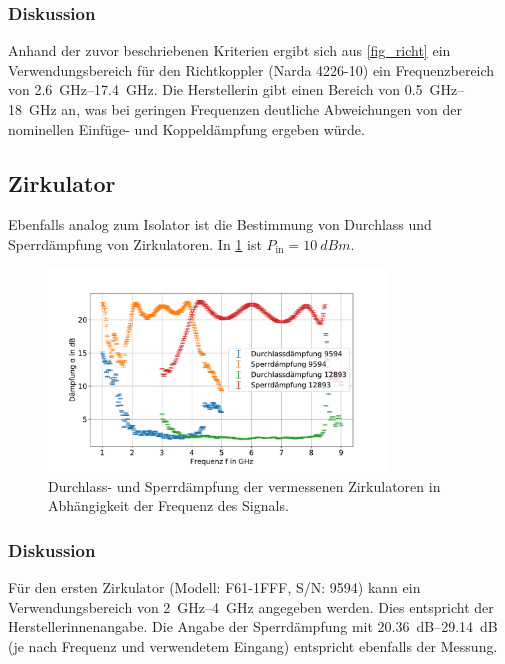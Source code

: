\documentclass[
	a4paper,
	12pt,
	pagesize,
	ngerman
]{scrartcl}
\begin{document}
	\subsubsection*{Diskussion}

	Anhand der zuvor beschriebenen Kriterien ergibt sich aus \cref{fig_richt} ein Verwendungsbereich für den Richtkoppler (Narda 4226-10) ein Frequenzbereich von \SIrange{2,6}{17,4}{\giga \hertz}.
	Die Herstellerin gibt einen Bereich von \SIrange{0,5}{18}{\giga \hertz} an, was bei geringen Frequenzen deutliche Abweichungen von der nominellen Einfüge- und Koppeldämpfung ergeben würde.

	\subsection{Zirkulator}
	Ebenfalls analog zum Isolator ist die Bestimmung von Durchlass und Sperrdämpfung von Zirkulatoren.
	In \cref{fig_zirk} ist  $P_\text{in}=\SI{10}{dBm}$.
	\begin{figure}[H]
		\includegraphics[width=0.8\textwidth]{img/zirkulator}
		\centering
		\caption{
	 	Durchlass- und Sperrdämpfung der vermessenen Zirkulatoren in Abhängigkeit der Frequenz des Signals.
		}
		\label{fig_zirk}
		\centering
	\end{figure}
	\subsubsection*{Diskussion}
	Für den ersten Zirkulator (Modell: F61-1FFF, S/N: 9594) kann ein Verwendungsbereich von \SIrange{2}{4}{\giga \hertz} angegeben werden.
	Dies entspricht der Herstellerinnenangabe.
	Die Angabe der Sperrdämpfung mit \SIrange{20,36}{29,14}{dB} (je nach Frequenz und verwendetem Eingang) entspricht ebenfalls der Messung.
\end{document}
